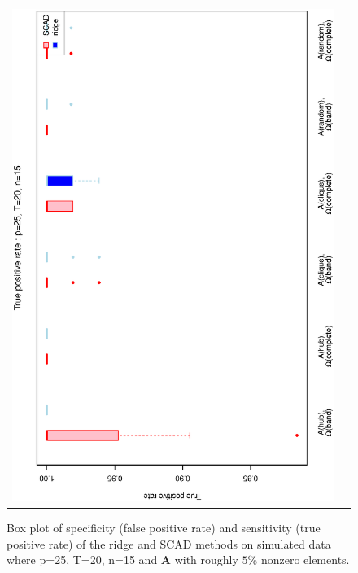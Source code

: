 \begin{figure}[h!]
\begin{tabular}{cc}
\includegraphics[scale=0.45,angle=270]{ROCtpr25T20N15_5.eps}
\end{tabular}
\caption{Box plot of specificity (false positive rate) and sensitivity (true positive rate) of the ridge and SCAD methods on simulated data where p=25, T=20,  n=15  and $\mathbf{A}$ with roughly $5\%$ nonzero elements.}
\label{figSM:RocP25T20N15_5}
\end{figure}


